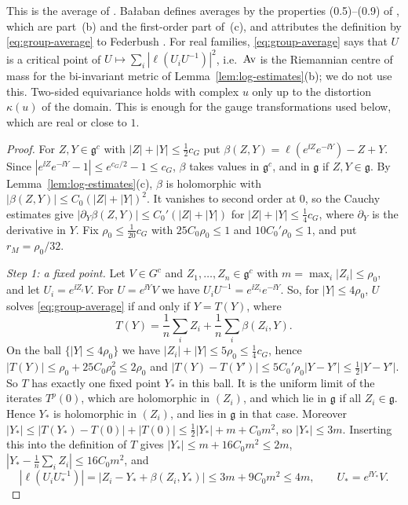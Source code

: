 This is the average of \cite[(0.10)]{BalYM4I}. Ba\l aban defines averages by the properties (0.5)--(0.9) of \cite{BalYM4I}, which are part~(b) and the first-order part of~(c), and attributes the definition by \eqref{eq:group-average} to Federbush \cite{Fed}. For real families, \eqref{eq:group-average} says that $U$ is a critical point of $U\mapsto\sum_i|\ell(U_iU^{-1})|^2$, i.e.\ $\operatorname{Av}$ is the Riemannian centre of mass for the bi-invariant metric of Lemma~\ref{lem:log-estimates}(b); we do not use this. Two-sided equivariance holds with complex $u$ only up to the distortion $\kappa(u)$ of the domain. This is enough for the gauge transformations used below, which are real or close to $1$.

\begin{proof}
For $Z,Y\in\mathfrak g^c$ with $|Z|+|Y|\le\frac12c_G$ put $\beta(Z,Y)=\ell(e^{\ii Z}e^{-\ii Y})-Z+Y$. Since $|e^{\ii Z}e^{-\ii Y}-1|\le e^{c_G/2}-1\le c_G$, $\beta$ takes values in $\mathfrak g^c$, and in $\mathfrak g$ if $Z,Y\in\mathfrak g$. By Lemma~\ref{lem:log-estimates}(c), $\beta$ is holomorphic with $|\beta(Z,Y)|\le C_0(|Z|+|Y|)^2$. It vanishes to second order at $0$, so the Cauchy estimates give $|\partial_Y\beta(Z,Y)|\le C_0'(|Z|+|Y|)$ for $|Z|+|Y|\le\frac14c_G$, where $\partial_Y$ is the derivative in $Y$. Fix $\rho_0\le\frac1{20}c_G$ with $25C_0\rho_0\le1$ and $10C_0'\rho_0\le1$, and put $r_M=\rho_0/32$.

\emph{Step 1: a fixed point.} Let $V\in G^c$ and $Z_1,\dots,Z_n\in\mathfrak g^c$ with $m=\max_i|Z_i|\le\rho_0$, and let $U_i=e^{\ii Z_i}V$. For $U=e^{\ii Y}V$ we have $U_iU^{-1}=e^{\ii Z_i}e^{-\ii Y}$. So, for $|Y|\le4\rho_0$, $U$ solves \eqref{eq:group-average} if and only if $Y=T(Y)$, where
\[
T(Y)=\frac1n\sum_iZ_i+\frac1n\sum_i\beta(Z_i,Y).
\]
On the ball $\{|Y|\le4\rho_0\}$ we have $|Z_i|+|Y|\le5\rho_0\le\frac14c_G$, hence $|T(Y)|\le\rho_0+25C_0\rho_0^2\le2\rho_0$ and $|T(Y)-T(Y')|\le5C_0'\rho_0|Y-Y'|\le\frac12|Y-Y'|$. So $T$ has exactly one fixed point $Y_*$ in this ball. It is the uniform limit of the iterates $T^p(0)$, which are holomorphic in $(Z_i)$, and which lie in $\mathfrak g$ if all $Z_i\in\mathfrak g$. Hence $Y_*$ is holomorphic in $(Z_i)$, and lies in $\mathfrak g$ in that case. Moreover $|Y_*|\le|T(Y_*)-T(0)|+|T(0)|\le\frac12|Y_*|+m+C_0m^2$, so $|Y_*|\le3m$. Inserting this into the definition of $T$ gives $|Y_*|\le m+16C_0m^2\le2m$, $|Y_*-\frac1n\sum_iZ_i|\le16C_0m^2$, and
\[
|\ell(U_iU_*^{-1})|=|Z_i-Y_*+\beta(Z_i,Y_*)|\le3m+9C_0m^2\le4m,\qquad U_*=e^{\ii Y_*}V .
\]


\end{proof}
